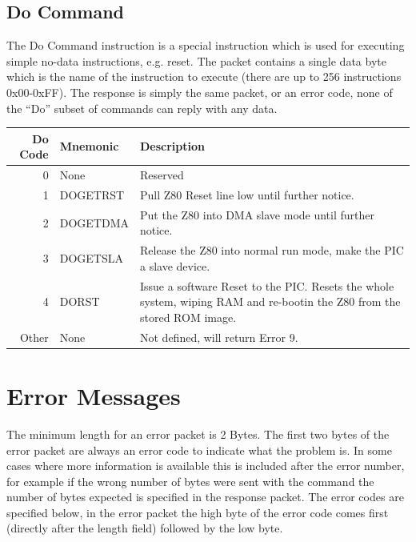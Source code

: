 \documentclass[a4paper,10pt]{book}
\begin{document}
\subsection{Do Command}
The Do Command instruction is a special instruction which is used for executing simple no-data instructions, e.g. reset.  The packet contains a single data byte which is the name of the instruction to execute (there are up to 256 instructions 0x00-0xFF).  The response is simply the same packet, or an error code, none of the ``Do'' subset of commands can reply with any data.

\begin{tabular}{|r|l|p{7cm}|}
 \hline
 \textbf{Do Code}&\textbf{Mnemonic}&\textbf{Description}\\
 \hline
 0&None&Reserved\\
 \hline
 1&DOGETRST&Pull Z80 Reset line low until further notice.\\
 \hline
 2&DOGETDMA&Put the Z80 into DMA slave mode until further notice.\\
 \hline
 3&DOGETSLA&Release the Z80 into normal run mode, make the PIC a slave device.\\
 \hline
 4&DORST&Issue a software Reset to the PIC.  Resets the whole system, wiping RAM and re-bootin the Z80 from the stored ROM image.\\
 \hline
 Other&None&Not defined, will return Error 9.\\
 \hline
\end{tabular}

\section{Error Messages}
The minimum length for an error packet is 2 Bytes.  The first two bytes of the error packet are always an error code to indicate what the problem is.  In some cases where more information is available this is included after the error number, for example if the wrong number of bytes were sent with the command the number of bytes expected is specified in the response packet.  The error codes are specified below, in the error packet the high byte of the error code comes first (directly after the length field) followed by the low byte.
\end{document}
